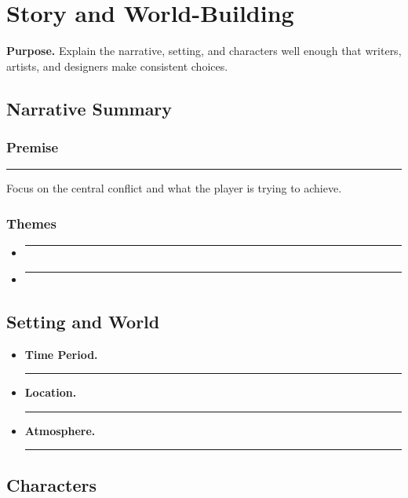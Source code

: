 \documentclass[12pt]{article}
\newcommand{\placeholder}[1]{\rule[-0.4em]{0pt}{2em}\rule{0.62\linewidth}{0.4pt}}
\begin{document}
\section{Story and World-Building}

\textbf{Purpose.} Explain the narrative, setting, and characters well enough that writers, artists,
and designers make consistent choices.

\subsection{Narrative Summary}

\subsubsection*{Premise}

\placeholder{One or two paragraphs that summarize the core story.} Focus on the central conflict
and what the player is trying to achieve.

\subsubsection*{Themes}

\begin{itemize}
    \item \placeholder{Core themes (e.g., redemption, survival, friendship, betrayal).}
    \item \placeholder{How those themes show up in gameplay and story events.}
\end{itemize}

\subsection{Setting and World}

\begin{itemize}
    \item \textbf{Time Period.} \placeholder{When the game takes place (past, present, future, etc.).}
    \item \textbf{Location.} \placeholder{Primary regions, nations, or realms.}
    \item \textbf{Atmosphere.} \placeholder{Overall vibe: dark and gritty, cute and whimsical, etc.}
\end{itemize}

\subsection{Characters}
\end{document}
